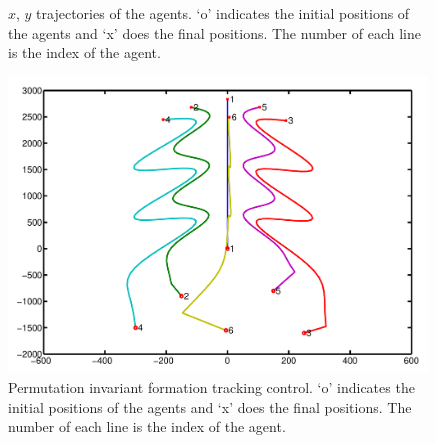 \documentclass[11pt, a4paper, oneside, openany, reqno]{book}
\theoremstyle{definition}
\theoremstyle{remark}
\numberwithin{equation}{chapter} %
\begin{document}
\begin{figure}[htp]
	\centering
	\caption{$ x $, $ y $ trajectories of the agents.
		`o' indicates the initial positions of the agents and 
		`x' does the final positions. The number of each line is the index of the agent.}	
\end{figure}

\begin{figure}[htp]
	\centering
	\includegraphics[width=0.99\textwidth]{formationTracking2.pdf}
	\caption{Permutation invariant formation tracking control.
		`o' indicates the initial positions of the agents and 
		`x' does the final positions. The number of each line is the index of the agent.}		
\end{figure}
\end{document}
